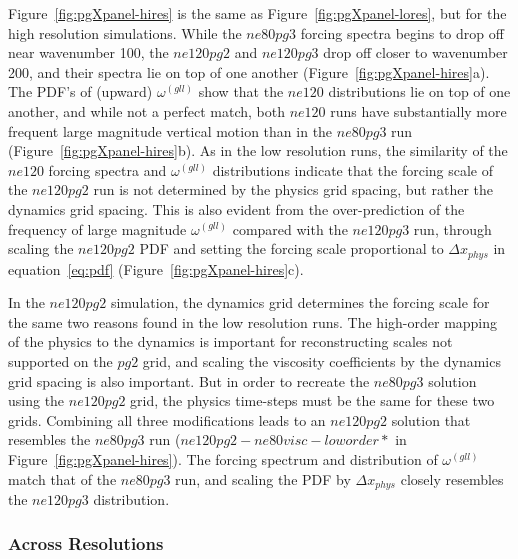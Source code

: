\documentclass[draft,linenumbers]{agujournal}
\begin{document}
Figure~\ref{fig:pgXpanel-hires} is the same as Figure~\ref{fig:pgXpanel-lores}, but for the high resolution simulations. While the $ne80pg3$ forcing spectra begins to drop off near wavenumber 100, the $ne120pg2$ and $ne120pg3$ drop off closer to wavenumber 200, and their spectra lie on top of one another (Figure~\ref{fig:pgXpanel-hires}a). The PDF's of (upward) $\omega^{(gll)}$ show that the $ne120$ distributions lie on top of one another, and while not a perfect match, both $ne120$ runs have substantially more frequent large magnitude vertical motion than in the $ne80pg3$ run (Figure~\ref{fig:pgXpanel-hires}b). As in the low resolution runs, the similarity of the $ne120$ forcing spectra and $\omega^{(gll)}$ distributions indicate that the forcing scale of the $ne120pg2$ run is not determined by the physics grid spacing, but rather the dynamics grid spacing. This is also evident from the over-prediction of the frequency of large magnitude $\omega^{(gll)}$ compared with the $ne120pg3$ run, through scaling the $ne120pg2$ PDF and setting the forcing scale proportional to $\Delta x_{phys}$ in equation~\eqref{eq:pdf} (Figure~\ref{fig:pgXpanel-hires}c).

In the $ne120pg2$ simulation, the dynamics grid determines the forcing scale for the same two reasons found in the low resolution runs. The high-order mapping of the physics to the dynamics is important for reconstructing scales not supported on the $pg2$ grid, and scaling the viscosity coefficients by the dynamics grid spacing is also important. But in order to recreate the $ne80pg3$ solution using the $ne120pg2$ grid, the physics time-steps must be the same for these two grids. Combining all three modifications leads to an $ne120pg2$ solution that resembles the $ne80pg3$ run ($ne120pg2-ne80visc-loworder*$ in Figure~\ref{fig:pgXpanel-hires}). The forcing spectrum and distribution of $\omega^{(gll)}$ match that of the $ne80pg3$ run, and scaling the PDF by $\Delta x_{phys}$ closely resembles the $ne120pg3$ distribution.

\subsubsection{Across Resolutions}\label{sec:allres}
\end{document}

